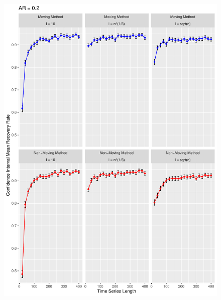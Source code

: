\documentclass[12pt, letterpaper, titlepage]{article}
\begin{document}
\begin{figure}[p]
  \centering
  \includegraphics[width=\textwidth]{ar_0.2}
  \caption{}
  \label{fig:ar_0.2}
\end{figure}
\end{document}
